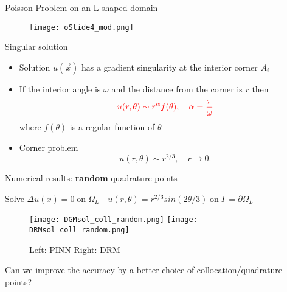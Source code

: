 \documentclass{beamer}
\begin{document}
\begin{frame}{Poisson Problem on an L-shaped domain}

\begin{figure}
  \texttt{[image: oSlide4\_mod.png]}
  \end{figure}

\end{frame}

\begin{frame}{Singular solution}
\begin{itemize}
\item Solution $u({\vec{x}})$ has a {\color{blue} gradient singularity at the interior corner} $A_i$

\item  If the interior angle is $\omega$ and the distance from the corner is $r$ then
$${\color{red} u(r,\theta) \sim r^{\alpha} f(\theta), \quad \alpha = \frac{\pi}{\omega}}$$
where $f(\theta)$ is a {\color{blue} regular function of $\theta$}

\item Corner problem
{\color {purple}$$ u(r,\theta) \sim r^{2/3}, \quad r \to 0.$$}



\end{itemize}
\end{frame}


\begin{frame}{Numerical results: {\bf random} quadrature points}

Solve $\Delta u(x) = 0 \;  \text{on} \; \Omega_{L} \quad u(r,\theta) = r^{2/3}sin(2\theta/3) \; \text{on} \; \Gamma = \partial \Omega_{L} $

\begin{figure}[ht!]
\centering
\texttt{[image: DGMsol\_coll\_random.png]}
\texttt{[image: DRMsol\_coll\_random.png]}

\caption{Left:  PINN                Right: DRM}
\end{figure}


\begin{center} {\color{blue} Can we improve the accuracy by a better choice of collocation/quadrature points?}   \end{center}

\end{frame}



\end{document}
